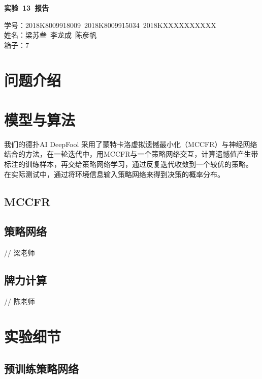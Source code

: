 \documentclass[11pt]{article}
\date{}
\title{}
\begin{document}
\pagestyle{fancy}
\chead{}

\begin{center}
  {\LARGE \bf 实验~13~报告}\\
\end{center}
\begin{flushright}
  { \heiti
    学号：2018K8009918009~2018K8009915034~2018KXXXXXXXXXX \\
    姓名：梁苏叁~李龙成~陈彦帆\\
    箱子：7 \\
  }
\end{flushright}


\section{问题介绍}
\label{sec:org585d0be}


\section{模型与算法}
\label{sec:org71115aa}
我们的德扑AI DeepFool 采用了蒙特卡洛虚拟遗憾最小化（MCCFR）与神经网络
结合的方法，在一轮迭代中，用MCCFR与一个策略网络交互，计算遗憾值产生带
标注的训练样本，再交给策略网络学习，通过反复迭代收敛到一个较优的策略。
在实际测试中，通过将环境信息输入策略网络来得到决策的概率分布。

\subsection{MCCFR}
\label{sec:org1094aa0}
\subsection{策略网络}
\label{sec:org8b0e6fc}
// 梁老师

\subsection{牌力计算}
\label{sec:orge742ac6}
// 陈老师

\section{实验细节}
\label{sec:orgb4e5d8d}
\subsection{预训练策略网络}
\label{sec:org9328ea4}
\end{document}
